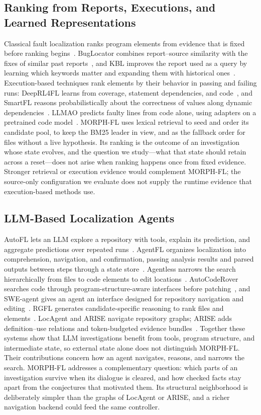 \documentclass[letterpaper,journal]{IEEEtran}
\newcommand{\tool}{MORPH-FL}
\begin{document}
\subsection{Ranking from Reports, Executions, and Learned Representations}
Classical fault localization ranks program elements from evidence that is fixed before ranking begins~\cite{flsurvey2016}. BugLocator combines report--source similarity with the fixes of similar past reports~\cite{buglocator2012}, and KBL improves the report used as a query by learning which keywords matter and expanding them with historical ones~\cite{kbl2025}. Execution-based techniques rank elements by their behavior in passing and failing runs: DeepRL4FL learns from coverage, statement dependencies, and code~\cite{deeprl4fl2021}, and SmartFL reasons probabilistically about the correctness of values along dynamic dependencies~\cite{smartfl2025}. LLMAO predicts faulty lines from code alone, using adapters on a pretrained code model~\cite{llmao2024}. \tool{} uses lexical retrieval to seed and order its candidate pool, to keep the BM25 leader in view, and as the fallback order for files without a live hypothesis. Its ranking is the outcome of an investigation whose state evolves, and the question we study---what that state should retain across a reset---does not arise when ranking happens once from fixed evidence. Stronger retrieval or execution evidence would complement \tool{}; the source-only configuration we evaluate does not supply the runtime evidence that execution-based methods use.

\subsection{LLM-Based Localization Agents}
AutoFL lets an LLM explore a repository with tools, explain its prediction, and aggregate predictions over repeated runs~\cite{autofl2024}. AgentFL organizes localization into comprehension, navigation, and confirmation, passing analysis results and parsed outputs between steps through a state store~\cite{agentfl2024}. Agentless narrows the search hierarchically from files to code elements to edit locations~\cite{agentless2025}. AutoCodeRover searches code through program-structure-aware interfaces before patching~\cite{autocoderover2024}, and SWE-agent gives an agent an interface designed for repository navigation and editing~\cite{sweagent2024}. RGFL generates candidate-specific reasoning to rank files and elements~\cite{rgfl2026}. LocAgent and ARISE navigate repository graphs; ARISE adds definition--use relations and token-budgeted evidence bundles~\cite{locagent2025,arise2026}. Together these systems show that LLM investigations benefit from tools, program structure, and intermediate state, so external state alone does not distinguish \tool{}. Their contributions concern how an agent navigates, reasons, and narrows the search. \tool{} addresses a complementary question: which parts of an investigation survive when its dialogue is cleared, and how checked facts stay apart from the conjectures that motivated them. Its structural neighborhood is deliberately simpler than the graphs of LocAgent or ARISE, and a richer navigation backend could feed the same controller.
\end{document}

